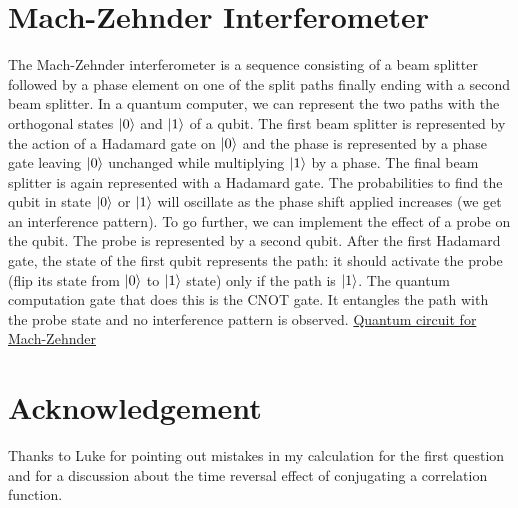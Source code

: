 \documentclass[10pt, a4paper]{article}
\begin{document}
\section{Mach-Zehnder Interferometer}
The Mach-Zehnder interferometer is a sequence consisting of a beam splitter followed by a phase element on one of the split paths finally ending with a second beam splitter. In a quantum computer, we can represent the two paths with the orthogonal states $\ket{0}$ and $\ket{1}$ of a qubit. The first beam splitter is represented by the action of a Hadamard gate on $\ket{0}$ and the phase is represented by a phase gate leaving $\ket{0}$ unchanged while multiplying $\ket{1}$ by a phase. The final beam splitter is again represented with a Hadamard gate.  The probabilities to find the qubit in state $\ket{0}$ or $\ket{1}$ will oscillate as the phase shift applied increases (we get an interference pattern). To go further, we can implement the effect of a probe on the qubit. The probe is represented by a second qubit. After the first Hadamard gate, the state of the first qubit represents the path: it should activate the probe (flip its state from $\ket{0}$ to $\ket{1}$ state) only if the path is $\ket{1}$. The quantum computation gate that does this is the CNOT gate. It entangles the path with the probe state and no interference pattern is observed. 
\href{https://quantum-computing.ibm.com/composer/files/new?initial=N4IgdghgtgpiBcIAKBLGAndMC0BBMALgPYpgwD6A4uhABbTlIDKAkgEwAMbAzCADQgAjhADOUBCADySAKIA5AIq4mAWQAEbAHQcA3AB0wpAMYAbAK4ATGGr1CYJlACMAjJuO39YA4KwBzNYIA2mwAup5GfmpGgQAsYQa0AYEc8WAADgAUaSgA9GwAlEkpnolBxQb8IFYiEShpBChEYBIgAL5AA}{Quantum circuit for Mach-Zehnder} 



\section{Acknowledgement}
Thanks to Luke for pointing out mistakes in my calculation for the first question and for a discussion about the time reversal effect of conjugating a correlation function.

\makereferences


\end{document}
